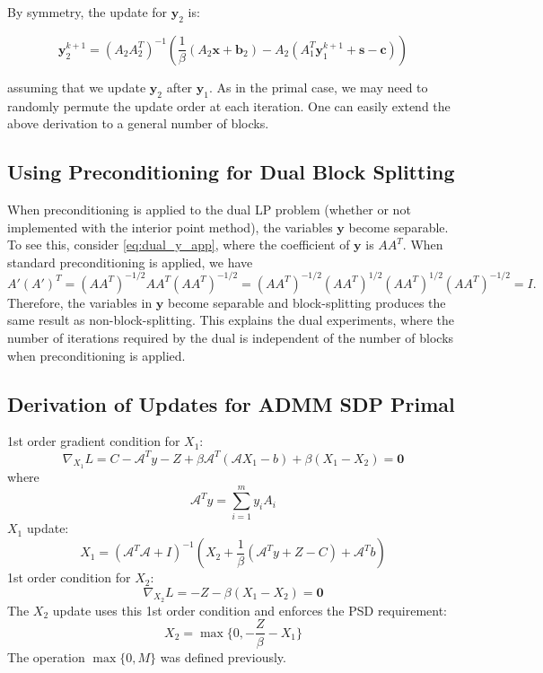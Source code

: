 \documentclass{article}
\begin{document}
By symmetry, the update for $\mathbf{y}_{2}$ is:

\[
\mathbf{y}_{2}^{k+1}=\left(A_{2}A_{2}^{T}\right)^{-1}\left(\frac{1}{\beta}\left(A_{2}\mathbf{x}+\mathbf{b}_{2}\right)-A_{2}\left(A_{1}^{T}\mathbf{y}_{1}^{k+1}+\mathbf{s}-\mathbf{c}\right)\right)
\]


assuming that we update $\mathbf{y}_{2}$ after $\mathbf{y}_{1}$. As in the primal case, we may need to randomly permute the update order at each iteration. One can easily extend the above derivation to a general number of blocks. 


{ \subsection*{Using Preconditioning for Dual Block Splitting}
When preconditioning is applied to the dual LP problem (whether or not implemented with the interior point method), the variables $\mathbf{y}$ become separable. To see this, consider \eqref{eq:dual_y_app}, where the coefficient of $\mathbf{y}$ is $A A^T$. When standard preconditioning is applied, we have
\[
A' (A')^T  = (AA^T )^{-1/2}A A^T (AA^T )^{-1/2} =  (AA^T )^{-1/2}(AA^T )^{1/2} (AA^T )^{1/2} (AA^T )^{-1/2}  = I.
\]
Therefore, the variables in $\mathbf{y}$ become separable and block-splitting produces the same result as non-block-splitting. This explains the dual experiments, where the number of iterations required by the dual is independent of the number of blocks when preconditioning is applied.


\subsection*{Derivation of Updates for ADMM SDP Primal}
1st order gradient condition for $X_{1}$:
\[
\nabla_{X_{1}}L=C-\mathcal{A}^{T}y-Z+\beta\mathcal{A}^{T}\left(\mathcal{A}X_{1}-b\right)+\beta\left(X_{1}-X_{2}\right)=\mathbf{0}
\]
where 
\[
\mathcal{A}^{T}y=\sum_{i=1}^{m}y_{i}A_{i}
\]
$X_{1}$ update:
\[
X_{1}=\left(\mathcal{A}^{T}\mathcal{A}+I\right)^{-1}\left(X_{2}+\frac{1}{\beta}\left(\mathcal{A}^{T}y+Z-C\right)+\mathcal{A}^{T}b\right)
\]
1st order condition for $X_{2}$:
\[
\nabla_{X_{2}}L=-Z-\beta\left(X_{1}-X_{2}\right)=\mathbf{0}
\]
The $X_{2}$ update uses this 1st order condition and enforces the PSD requirement:
\[
X_{2} = \max\{0,-\frac{Z}{\beta}-X_{1}\}
\]
The operation $\max\{0,M\}$ was defined previously.

}
\end{document}
